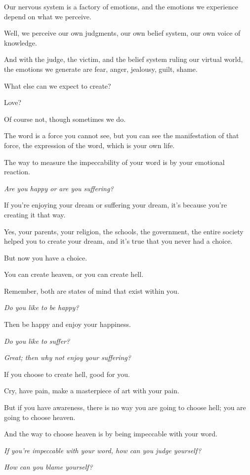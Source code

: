 \documentclass{article}
\numberwithin{equation}{section}
\begin{document}
Our nervous system is a factory of emotions, and the emotions we experience depend on what we perceive.

Well, we perceive our own judgments, our own belief system, our own voice of knowledge.

And with the judge, the victim, and the belief system ruling our virtual world, the emotions we generate are fear, anger, jealousy, guilt, shame.

What else can we expect to create?

Love?

Of course not, though sometimes we do.

%
The word is a force you cannot see, but you can see the manifestation of that force, the expression of the word, which is your own life.

The way to measure the impeccability of your word is by your emotional reaction.

\textit{Are you happy or are you suffering?}

If you're enjoying your dream or suffering your dream, it's because you're creating it that way.

Yes, your parents, your religion, the schools, the government, the entire society helped you to create your dream, and it's true that you never had a choice.

But now you have a choice.

You can create heaven, or you can create hell.

Remember, both are states of mind that exist within you.

%
\textit{Do you like to be happy?}

Then be happy and enjoy your happiness.

\textit{Do you like to suffer?}

\textit{Great; then why not enjoy your suffering?}

If you choose to create hell, good for you.

Cry, have pain, make a masterpiece of art with your pain.

But if you have awareness, there is no way you are going to choose hell; you are going to choose heaven.

And the way to choose heaven is by being impeccable with your word.

%
\textit{If you're impeccable with your word, how can you judge yourself?}

\textit{How can you blame yourself?}
\end{document}
